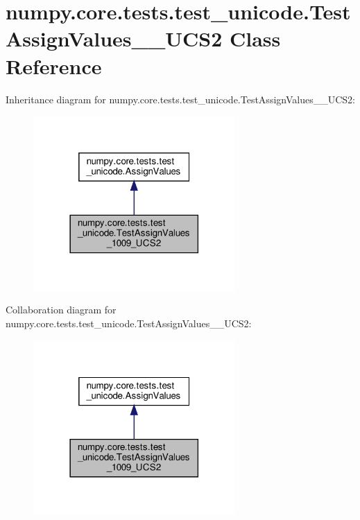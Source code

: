 \hypertarget{classnumpy_1_1core_1_1tests_1_1test__unicode_1_1TestAssignValues__1009__UCS2}{}\section{numpy.\+core.\+tests.\+test\+\_\+unicode.\+Test\+Assign\+Values\+\_\+\_\+\+U\+C\+S2 Class Reference}
\label{classnumpy_1_1core_1_1tests_1_1test__unicode_1_1TestAssignValues__1009__UCS2}


Inheritance diagram for numpy.\+core.\+tests.\+test\+\_\+unicode.\+Test\+Assign\+Values\+\_\+\_\+\+U\+C\+S2\+:
\nopagebreak
\begin{figure}[H]
\begin{center}
\leavevmode
\includegraphics[width=218pt]{classnumpy_1_1core_1_1tests_1_1test__unicode_1_1TestAssignValues__1009__UCS2__inherit__graph}
\end{center}
\end{figure}


Collaboration diagram for numpy.\+core.\+tests.\+test\+\_\+unicode.\+Test\+Assign\+Values\+\_\+\_\+\+U\+C\+S2\+:
\nopagebreak
\begin{figure}[H]
\begin{center}
\leavevmode
\includegraphics[width=218pt]{classnumpy_1_1core_1_1tests_1_1test__unicode_1_1TestAssignValues__1009__UCS2__coll__graph}
\end{center}
\end{figure}
